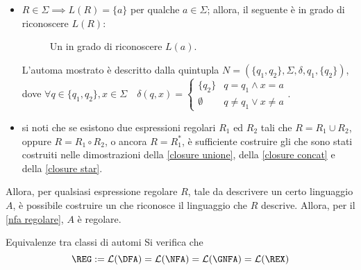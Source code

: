 \documentclass[a4paper, 12pt]{report}
\begin{document}
{\begin{itemize}
                L'automa mostrato è descritto dalla quintupla $N = (\{q_0\}, \Sigma, \delta, q_0, \{q_0\})$, dove $\forall a \in \Sigma \quad \delta(q_0, a) = \emptyset$.

            \item $R \in \Sigma \implies L(R) = \{a \}$ per qualche $a \in \Sigma$; allora, il seguente \NFA è in grado di riconoscere $L(R)$:

                \begin{figure}[H]
                    \centering
                    \caption{Un \NFA in grado di riconoscere $L(a)$.}
                \end{figure}

                L'automa mostrato è descritto dalla quintupla $N = (\{q_1, q_2\}, \Sigma, \delta, q_1, \{q_2\})$, dove $\forall q \in \{q_1, q_2\}, x \in \Sigma \quad \delta(q, x) = \left \{ \begin{array}{ll} \{q_2\} & q = q_1 \land x = a \\ \emptyset & q \neq q_1 \lor x \neq a \end{array} \right.$.

            \item si noti che se esistono due espressioni regolari $R_1$ ed $R_2$ tali che $R = R_1 \cup R_2$, oppure $R = R_1 \circ R_2$, o ancora $R = R_1^*$, è sufficiente costruire gli \NFA che sono stati costruiti nelle dimostrazioni della \cref{closure unione}, della \cref{closure concat} e della \cref{closure star}.
        \end{itemize}

        Allora, per qualsiasi espressione regolare $R$, tale da descrivere un certo linguaggio $A$, è possibile costruire un \NFA che riconosce il linguaggio che $R$ descrive. Allora, per il \cref{nfa regolare}, $A$ è regolare.
    }

    \begin{framedcor}{Equivalenze tra classi di automi}
         Si verifica che $$\mathrm{\REG} := \mathcal{L}(\mathrm{\DFA}) = \mathcal{L}(\mathrm{\NFA}) = \mathcal{L}(\mathrm{\GNFA}) = \mathcal{L}(\REX)$$
    \end{framedcor}
\end{document}
